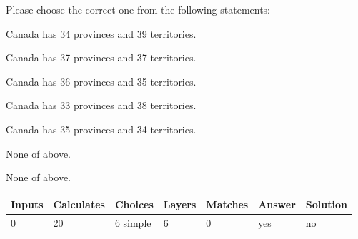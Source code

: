 \documentclass[12pt]{article}
\begin{document}
  
Please choose the correct one from the following statements:
 
 
Canada has  %
34 provinces and  %
39 territories.
 
 
Canada has  %
37 provinces and  %
37 territories.
 
 
Canada has  %
36 provinces and  %
35 territories.
 
 
Canada has  %
33 provinces and  %
38 territories.
 
 
Canada has  %
35 provinces and  %
34 territories.
 
 
 None of above.
 
 
\noindent{}
 
 
 None of above.
 
 
\noindent{}
 
 
   
   
   
   
\noindent\begin{tabular}{|l|l|l|l|l|l|l|}
 \hline
Inputs & Calculates & Choices & Layers & Matches & Answer & Solution \\ \hline
           0  & 
          20  & 
           6
  simple  
  & 
           6  & 
           0  & 
  yes & 
  no 
  \\ \hline
 \end{tabular}
   
   
   
   
\noindent{}
   
   
  
\end{document}
